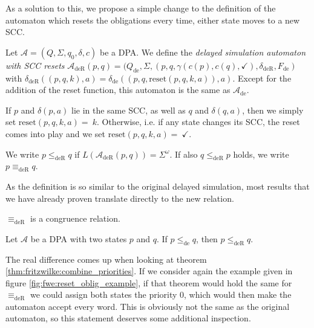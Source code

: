 As a solution to this, we propose a simple change to the definition of the automaton which resets the obligations every time, either state moves to a new SCC. 

\begin{defn}
	Let $\mathcal{A} = (Q, \Sigma, q_0, \delta, c)$ be a DPA. We define the \emph{delayed simulation automaton with SCC resets} $\mathcal{A}_\text{deR}(p, q) = (Q_\text{de}, \Sigma, (p, q, \gamma(c(p), c(q), \checkmark), \delta_\text{deR}, F_\text{de})$ with $\delta_\text{deR}((p, q, k), a) = \delta_\text{de}((p, q, \text{reset}(p, q, k, a)), a)$. Except for the addition of the reset function, this automaton is the same as $\mathcal{A}_\text{de}$.
	
	If $p$ and $\delta(p, a)$ lie in the same SCC, as well as $q$ and $\delta(q, a)$, then we simply set $\text{reset}(p, q, k, a) =~k$. Otherwise, i.e. if any state changes its SCC, the reset comes into play and we set $\text{reset}(p, q, k, a) =~\checkmark$.
	
	We write $p \leq_\text{deR} q$ if $L(\mathcal{A}_\text{deR}(p, q)) = \Sigma^\omega$. If also $q \leq_\text{deR} p$ holds, we write $p \equiv_\text{deR} q$.
\end{defn}

As the definition is so similar to the original delayed simulation, most results that we have already proven translate directly to the new relation.

\begin{theorem}
	$\equiv_\text{deR}$ is a congruence relation.
\end{theorem}

\begin{lem}
	Let $\mathcal{A}$ be a DPA with two states $p$ and $q$. If $p \leq_\text{de} q$, then $p \leq_\text{deR} q$.
\end{lem}

The real difference comes up when looking at theorem \ref{thm:fritzwilke:combine_priorities}. If we consider again the example given in figure \ref{fig:fwe:reset_oblig_example}, if that theorem would hold the same for $\equiv_\text{deR}$ we could assign both states the priority $0$, which would then make the automaton accept every word. This is obviously not the same as the original automaton, so this statement deserves some additional inspection.









